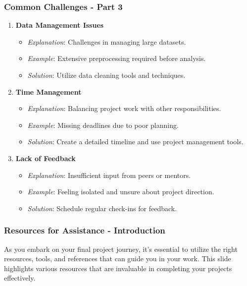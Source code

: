 \documentclass[aspectratio=169]{beamer}
\begin{document}
\begin{frame}[fragile]
    \frametitle{Common Challenges - Part 3}

    \begin{enumerate}[resume]
        \item \textbf{Data Management Issues}
            \begin{itemize}
                \item \textit{Explanation}: Challenges in managing large datasets.
                \item \textit{Example}: Extensive preprocessing required before analysis.
                \item \textit{Solution}: Utilize data cleaning tools and techniques.
            \end{itemize}

        \item \textbf{Time Management}
            \begin{itemize}
                \item \textit{Explanation}: Balancing project work with other responsibilities.
                \item \textit{Example}: Missing deadlines due to poor planning.
                \item \textit{Solution}: Create a detailed timeline and use project management tools.
            \end{itemize}

        \item \textbf{Lack of Feedback}
            \begin{itemize}
                \item \textit{Explanation}: Insufficient input from peers or mentors.
                \item \textit{Example}: Feeling isolated and unsure about project direction.
                \item \textit{Solution}: Schedule regular check-ins for feedback.
            \end{itemize}
    \end{enumerate}
\end{frame}

\begin{frame}[fragile]
    \frametitle{Resources for Assistance - Introduction}
    As you embark on your final project journey, it's essential to utilize the right resources, tools, and references that can guide you in your work. This slide highlights various resources that are invaluable in completing your projects effectively.
\end{frame}
\end{document}
